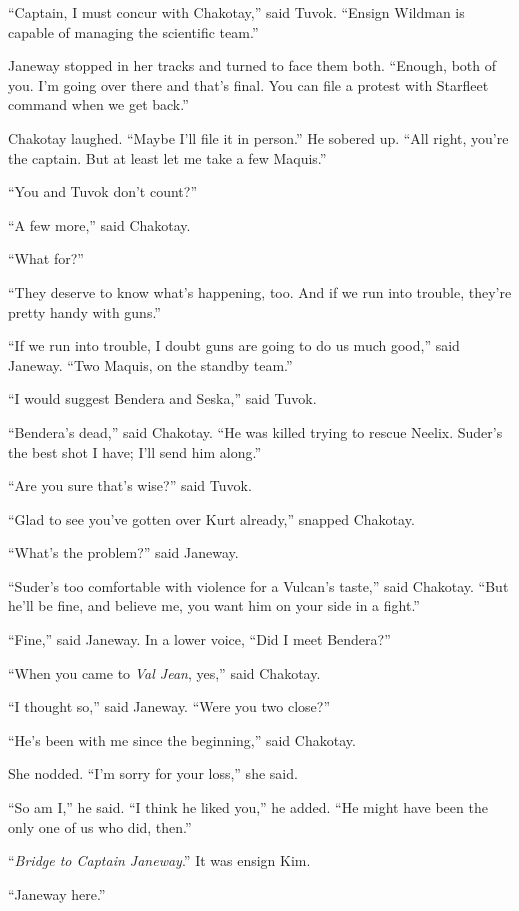 \documentclass[twoside,letterpaper,12pt]{memoir}
\begin{document}
``Captain, I must concur with Chakotay,'' said Tuvok. ``Ensign Wildman is capable of managing the scientific team.'' 

Janeway stopped in her tracks and turned to face them both. ``Enough, both of you. I'm going over there and that's final. You can file a protest with Starfleet command when we get back.'' 

Chakotay laughed. ``Maybe I'll file it in person.'' He sobered up. ``All right, you're the captain. But at least let me take a few Maquis.'' 

``You and Tuvok don't count?'' 

``A few more,'' said Chakotay. 

``What for?'' 

``They deserve to know what's happening, too. And if we run into trouble, they're pretty handy with guns.'' 

``If we run into trouble, I doubt guns are going to do us much good,'' said Janeway. ``Two Maquis, on the standby team.'' 

``I would suggest Bendera and Seska,'' said Tuvok. 

``Bendera's dead,'' said Chakotay. ``He was killed trying to rescue Neelix. Suder's the best shot I have; I'll send him along.'' 

``Are you sure that's wise?'' said Tuvok. 

``Glad to see you've gotten over Kurt already,'' snapped Chakotay. 

``What's the problem?'' said Janeway. 

``Suder's too comfortable with violence for a Vulcan's taste,'' said Chakotay. ``But he'll be fine, and believe me, you want him on your side in a fight.'' 

``Fine,'' said Janeway. In a lower voice, ``Did I meet Bendera?'' 

``When you came to \textit{Val Jean}, yes,'' said Chakotay. 

``I thought so,'' said Janeway. ``Were you two close?'' 

``He’s been with me since the beginning,'' said Chakotay. 

She nodded. ``I'm sorry for your loss,'' she said. 

``So am I,'' he said. ``I think he liked you,'' he added. ``He might have been the only one of us who did, then.''

``\textit{Bridge to Captain Janeway}.'' It was ensign Kim. 

``Janeway here.'' 
\end{document}
